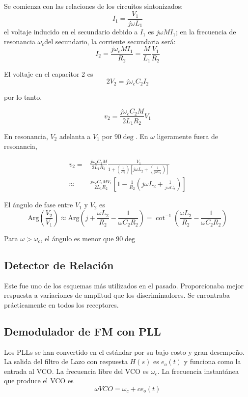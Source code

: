 \documentclass[12pt,letterpaper,titlepage,twoside]{book}
\begin{document}
Se comienza con las relaciones de los circuitos sintonizados:
\begin{equation}
I_1 = \frac{V_1}{j\omega L_1}
\end{equation}
el voltaje inducido en el secundario debido a $I_1$ es $j\omega M I_1$; en la frecuencia de resonancia $\omega_c$del secundario, la corriente secundaria será:
\begin{equation}
I_2 = \frac{j\omega_c M I_1}{R_2} = \frac{M}{L_1} \frac{V_1}{R_2}
\end{equation}

El voltaje en el capacitor 2 es
\begin{equation}
2V_2 = j\omega_c C_2 I_2
\end{equation}

por lo tanto,

\begin{equation}
v_2 = \frac{j\omega_c C_2 M}{2 L_1 R_2} V_1
\end{equation}

En resonancia, $V_2$ adelanta a $V_1$ por $90\deg$. En $\omega$ ligeramente fuera de resonancia,

\begin{align}
v_2 =& \frac{j\omega_c C_2 M}{2 L_1 R_2} \frac{V_1}{1+\left(\frac{1}{R_2}\right) \left[ j \omega L_2 + \left(\frac{1}{j\omega C_2} \right)\right]}\\
\approx& \frac{j\omega_c C_2 M V_1}{2 L_1 R_2} \left[ 1 - \frac{1}{R_2}\left( j \omega L_2 +\frac{1}{j \omega C_2} \right)  \right]
\end{align}

El ángulo de fase entre $V_1$ y $V_2$ es
\begin{equation}
\text{Arg} \left( \frac{V_2}{V_1}\right) \approx \text{Arg} \left( j +\frac{\omega L_2}{R_2} - \frac{1}{\omega C_2 R_2}  \right) = \cot^{-1}\left( \frac{\omega L_2}{R_2} - \frac{1}{\omega C_2 R_2}  \right)
\end{equation}
 
 Para $\omega > \omega_c$, el ángulo es menor que $90\deg$

\subsection{Detector de Relación}
Este fue uno de los esquemas más utilizados en el pasado. Proporcionaba mejor respuesta a variaciones de amplitud que los discriminadores. Se encontraba prácticamente en todos los receptores.

\subsection{Demodulador de FM con PLL}
Los PLLs se han convertido en el estándar por su bajo costo y gran desempeño. La salida del filtro de Lazo con  respuesta $H(s)$ es $e_o(t)$ y funciona como la entrada al VCO. La frecuencia libre del VCO es $\omega_c$. La frecuencia instantánea que produce el VCO es
\begin{equation}
\omega{VCO}= \omega_c +c e_o(t) \label{eq:wvco}
\end{equation}
\end{document}
